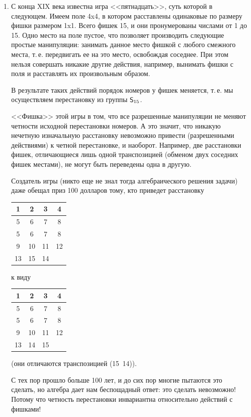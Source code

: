 \begin{enumerate}
\item С конца XIX века известна игра <<пятнадцать>>, суть которой в следующем. Имеем поле 4x4, в котором расставлены одинаковые по размеру фишки размером 1x1. Всего фишек 15, и они пронумерованы числами от 1 до 15. Одно место на поле пустое, что позволяет производить следующие простые манипуляции: занимать данное место фишкой с любого смежного места, т.\,е. передвигать ее на это место, освобождая соседнее.
При этом нельзя совершать никакие другие действия, например, вынимать фишки с поля и расставлять их произвольным образом.

В результате таких действий порядок номеров у фишек меняется, т.\,е. мы осуществляем перестановку из группы ${\mathsf{S}}_{15}$.

<<Фишка>> этой игры в том, что все разрешенные манипуляции не меняют четности исходной перестановки номеров. А это значит, что никакую нечетную изначальную расстановку невозможно привести (разрешенными действиями) к четной перестановке, и наоборот. Например, две расстановки фишек, отличающиеся лишь одной транспозицией (обменом двух соседних фишек местами), не могут быть переведены одна в другую.

Создатель игры (никто еще не знал тогда алгебраического решения задачи) даже обещал приз 100 долларов тому, кто приведет расстановку
\begin{center}
\begin{tabular}{|c|c|c|c|}
\hline
1 & 2 & 3 & 4 \\ \hline
5 & 6 & 7 & 8 \\ \hline
5 & 6 & 7 & 8 \\ \hline
9 & 10 & 11 & 12 \\ \hline
13 &15 & 14 & \\ \hline
\end{tabular}
\quad к виду \quad
\begin{tabular}{|c|c|c|c|}
\hline
1 & 2 & 3 & 4 \\ \hline
5 & 6 & 7 & 8 \\ \hline
5 & 6 & 7 & 8 \\ \hline
9 & 10 & 11 & 12 \\ \hline
13 &14 & 15 & \\ \hline
\end{tabular}
\end{center}
(они отличаются транспозицией (15\ 14)).

С тех пор прошло больше 100 лет, и до сих пор многие пытаются это сделать, но алгебра дает нам беспощадный ответ: это сделать невозможно! Потому что четность перестановки инвариантна относительно действий с фишками!


\end{enumerate}
